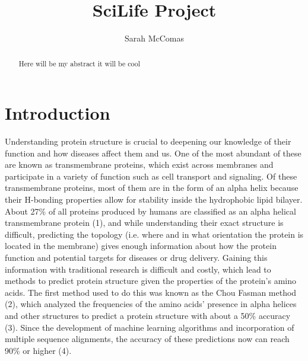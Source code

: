 \documentclass{article}
\begin{document}
\title{SciLife Project}
\author{Sarah McComas}
\maketitle

\clearpage


\begin{abstract}
Here will be my abstract it will be cool
\end{abstract}




\section{Introduction} 

Understanding protein structure is crucial to deepening our knowledge of their function and how diseases affect them and us. One of the most abundant of these are known as transmembrane proteins, which exist across membranes and participate in a variety of function such as cell transport and signaling. Of these transmembrane proteins, most of them are in the form of an alpha helix because their H-bonding properties allow for stability inside the hydrophobic lipid bilayer. About 27\% of all proteins produced by humans are classified as an alpha helical transmembrane protein (1), and while understanding their exact structure is difficult, predicting the topology (i.e. where and in what orientation the protein is located in the membrane) gives enough information about how the protein function and potential targets for diseases or drug delivery. Gaining this information with traditional research is difficult and costly, which lead to methods to predict protein structure given the properties of the protein's amino acids. The first method used to do this was known as the Chou Fasman method (2), which analyzed the frequencies of the amino acids' presence in alpha helices and other structures to predict a protein structure with about a 50\% accuracy (3). Since the development of machine learning algorithms and incorporation of multiple sequence alignments, the accuracy of these predictions now can reach 90\% or higher (4). 
\end{document}
